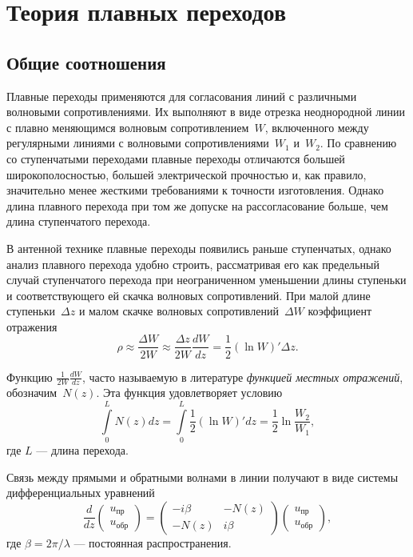 
\section{Теория плавных переходов}


\subsection{Общие соотношения}

Плавные переходы применяются для согласования линий с различными волновыми
сопротивлениями. Их выполняют в виде отрезка неоднородной линии с плавно
меняющимся волновым сопротивлением~$W$, включенного между регулярными линиями
с волновыми сопротивлениями~$W_1$ и~$W_2$. По сравнению со ступенчатыми
переходами плавные переходы отличаются большей широкополосностью, большей
электрической прочностью и, как правило, значительно менее жесткими требованиями
к точности изготовления. Однако длина плавного перехода при том же допуске
на рассогласование больше, чем длина ступенчатого перехода.

В антенной технике плавные переходы появились раньше ступенчатых, однако анализ
плавного перехода удобно строить, рассматривая его как предельный случай
ступенчатого перехода при неограниченном уменьшении длины ступеньки
и соответствующего ей скачка волновых сопротивлений. При малой длине
ступеньки~$\Delta{z}$ и малом скачке волновых сопротивлений~$\Delta{W}$
коэффициент отражения
\begin{equation*}
    \rho \approx \frac{\Delta{W}}{2W}
         \approx \frac{\Delta{z}}{2W}\frac{dW}{dz}
         = \frac{1}{2} (\ln W)' \Delta{z}.
\end{equation*}

Функцию $\frac{1}{2W}\frac{dW}{dz}$, часто называемую в литературе
\emph{функцией местных отражений}, обозначим~$N(z)$. Эта функция удовлетворяет
условию
\begin{equation}
    \label{eq:GradingTransition:ConditionForN}
    \int\limits_0^L N(z)dz
        = \int\limits_0^L \frac{1}{2} (\ln W)' dz
        = \frac{1}{2} \ln \frac{W_2}{W_1},
\end{equation}
где $L$ --- длина перехода.

Связь между прямыми и обратными волнами в линии получают в виде системы
дифференциальных уравнений
\begin{equation}
    \label{eq:GradingTransition:MainDiffEquations}
    \frac{d}{dz}
    \begin{pmatrix}
        u_{пр} \\
        u_{обр}
    \end{pmatrix} =
    \begin{pmatrix}
        -i\beta & -N(z) \\
        -N(z)   & i\beta
    \end{pmatrix}
    \begin{pmatrix}
        u_{пр} \\
        u_{обр}
    \end{pmatrix},
\end{equation}
где $\beta=2\pi/\lambda$ --- постоянная распространения.

